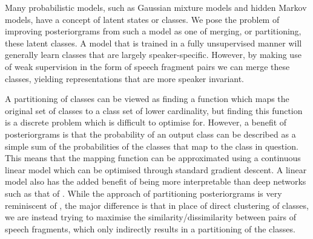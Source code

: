 Many probabilistic models, such as Gaussian mixture models and hidden Markov models, have a concept of latent states or classes.
We pose the problem of improving posteriorgrams from such a model as one of merging, or partitioning, these latent classes.
A model that is trained in a fully unsupervised manner will generally learn classes that are largely speaker-specific.
However, by making use of weak supervision in the form of speech fragment pairs we can merge these classes, yielding representations that are more speaker invariant.

A partitioning of classes can be viewed as finding a function which maps the original set of classes to a class set of lower cardinality, but finding this function is a discrete problem which is difficult to optimise for.
However, a benefit of posteriorgrams is that the probability of an output class can be described as a simple sum of the probabilities of the classes that map to the class in question.
This means that the mapping function can be approximated using a continuous linear model which can be optimised through standard gradient descent.
A linear model also has the added benefit of being more interpretable than deep networks such as that of \textcite{thiolliere2015hybrid}.
While the approach of partitioning posteriorgrams is very reminiscent of \textcite{jansen2013weak}, the major difference is that in place of direct clustering of classes, we are instead trying to maximise the similarity/dissimilarity between pairs of speech fragments, which only indirectly results in a partitioning of the classes.

